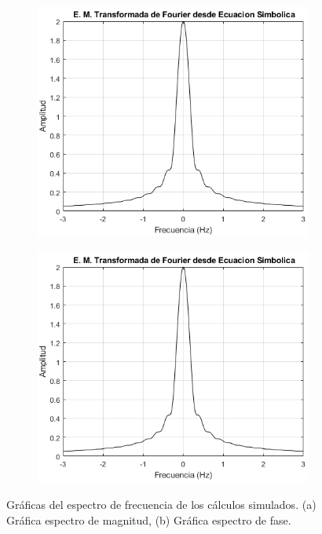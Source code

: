 \documentclass[11pt,letterpaper,twocolumn]{article}
\begin{document}
    \begin{figure}[H]
        \centering 
        \begin{subfigure}[h]{0.49\linewidth}
            \includegraphics[width=\linewidth]{img/EMagnitudTF_ESimbolica.png}
            \caption{}
            \label{magnitudTeorica}
        \end{subfigure}
        \begin{subfigure}[h]{0.49\linewidth}
            \includegraphics[width=\linewidth]{img/EMagnitudTF_ESimbolica.png}
            \caption{}
            \label{faseTorica}
        \end{subfigure}
        \caption{Gráficas del espectro de frecuencia de los cálculos simulados. (a) Gráfica 
                espectro de magnitud, (b) Gráfica espectro de fase.}
        \label{espectroTeorico}
    \end{figure} 
\end{document}
